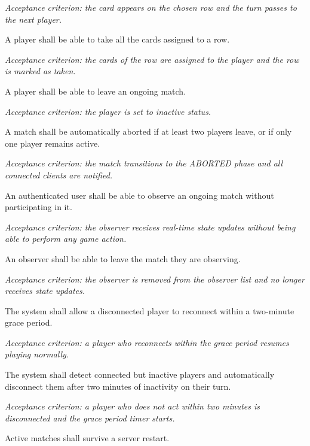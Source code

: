 \documentclass{scrartcl}
\begin{document}
\begin{description}
  \textit{Acceptance criterion: the card appears on the chosen row and the turn passes to the next player.}

  \item[F9] A player shall be able to take all the cards assigned to a row.

  \textit{Acceptance criterion: the cards of the row are assigned to the player and the row is marked as taken.}

  \item[F10] A player shall be able to leave an ongoing match.

  \textit{Acceptance criterion: the player is set to inactive status.}

  \item[F11] A match shall be automatically aborted if at least two players leave, or if only one player remains active.

  \textit{Acceptance criterion: the match transitions to the ABORTED phase and all connected clients are notified.}

\item[F12] An authenticated user shall be able to observe an ongoing match without participating in it.

  \textit{Acceptance criterion: the observer receives real-time state updates without being able to perform any game action.}

  \item[F13] An observer shall be able to leave the match they are observing.

  \textit{Acceptance criterion: the observer is removed from the observer list and no longer receives state updates.}

  \item[F14] The system shall allow a disconnected player to reconnect within a two-minute grace period.

  \textit{Acceptance criterion: a player who reconnects within the grace period resumes playing normally.}

  \item[F15] The system shall detect connected but inactive players and automatically disconnect them after two minutes of inactivity on their turn.

  \textit{Acceptance criterion: a player who does not act within two minutes is disconnected and the grace period timer starts.}

  \item[F16] Active matches shall survive a server restart.


\end{description}
\end{document}
